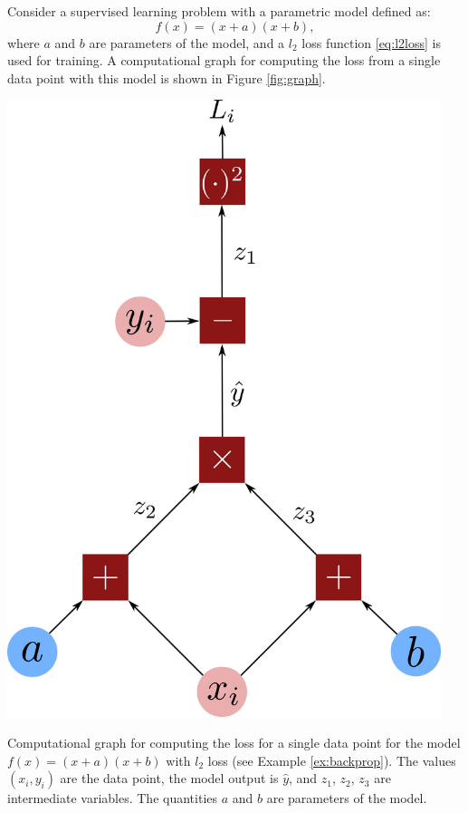 \begin{example} \label{ex:backprop}
Consider a supervised learning problem with a parametric model defined as:
\begin{equation*}
f(x) = (x+a)(x+b),
\end{equation*}
where $a$ and $b$ are parameters of the model, and a $l_2$ loss function \eqref{eq:l2loss} is used for training. A computational graph for computing the loss from a single data point with this model is shown in Figure \ref{fig:graph}.
\begin{marginfigure}
\begin{center}
\includegraphics[width=0.95\textwidth]{tex/figs/app01_figs/graph.png}
\caption{Computational graph for computing the loss for a single data point for the model $f(x) = (x+a)(x+b)$ with $l_2$ loss (see Example \ref{ex:backprop}). The values $(x_i, y_i)$ are the data point, the model output is $\hat{y}$, and $z_1$, $z_2$, $z_3$ are intermediate variables. The quantities $a$ and $b$ are parameters of the model.}
\label{fig:graph}
\end{center}
\end{marginfigure}


\end{example}
